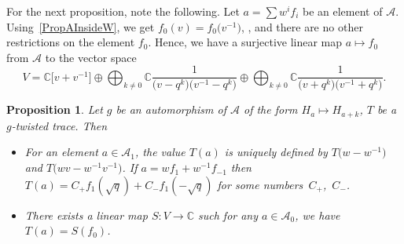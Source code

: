 \documentclass[pdftex]{sigma}
\newcommand\CC{\mathbb{C}}
\newcommand{\mc}{\mathcal}
\numberwithin{equation}{section}
\newtheorem{Proposition}[Theorem]{Proposition}
\theoremstyle{definition}
\begin{document}
For the next proposition, note the following. Let $a=\sum w^i f_i$ be an element of $\mc{A}$. Using~\ref{PropAInsideW}, we get $f_0(v)=f_0\bigl(v^{-1}\bigr)$, , and there are no other restrictions on the element $f_0$. Hence, we have a surjective linear map $a\mapsto f_0$ from $\mc{A}$ to the vector space \[V=\CC\big[v+v^{-1}\big]\oplus\bigoplus_{k\neq 0}\CC\frac{1}{\bigl(v-q^k\bigr)\bigl(v^{-1}-q^{k}\bigr)}\oplus\bigoplus_{k\neq 0}\CC\frac{1}{\bigl(v+q^k\bigr)\bigl(v^{-1}+q^{k}\bigr)}.\]
\begin{Proposition}
\label{PropTraceOnEvenElements}
 Let $g$ be an automorphism of $\mc{A}$ of the form $H_a\mapsto H_{a+k}$, $T$ be a $g$-twisted trace. Then
 \begin{itemize}\itemsep=0pt
 \item
 For an element $a\in\mc{A}_{1}$, the value $T(a)$ is uniquely defined by $T\bigl(w-w^{-1}\bigr)$ and $T\bigl(wv-w^{-1}v^{-1}\bigr)$. If $a=wf_1+w^{-1}f_{-1}$ then $T(a)=C_+f_1(\sqrt{q})+C_-f_1(-\sqrt{q})$ for some numbers~$C_+$,~$C_-$.
 \item
 There exists a linear map $S\colon V\to \CC$ such for any $a\in \mc{A}_0$, we have $T(a)=S(f_0)$.
 \end{itemize}
\end{Proposition}
\end{document}

